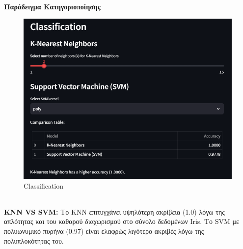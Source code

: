 \documentclass{article}
\begin{document}
{{{{{{\newpage
\textbf{Παράδειγμα Κατηγοριοποίησης}
\begin{figure}[h!]
  \centering
  \includegraphics[width=0.6\textheight]{photos/classification.png}
  \caption{Classification}
  \label{fig:Classification}
\end{figure} \\
\textbf{KNN VS SVM:} Το KNN επιτυγχάνει υψηλότερη ακρίβεια (1.0) λόγω της απλότητας και του καθαρού διαχωρισμού στο σύνολο δεδομένων Iris. Το SVM με πολυωνυμικό πυρήνα (0.97) είναι ελαφρώς λιγότερο ακριβές λόγω της πολυπλοκότητας του.

}}}}}}
\end{document}
